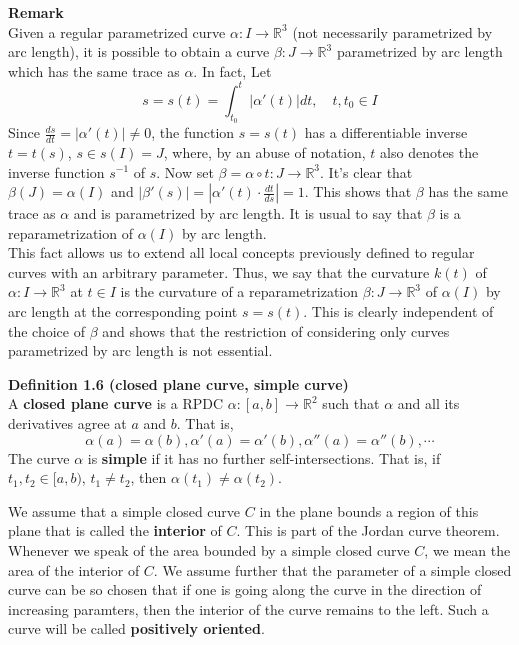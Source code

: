 \documentclass{article}
\begin{document}
\par
\textbf{Remark}\\
Given a regular parametrized curve $\alpha:I \to \mathbb R^3$ (not necessarily parametrized by arc length), it is
possible to obtain a curve $\beta:J \to \mathbb R^3$ parametrized by arc length which has the same trace as 
$\alpha$. In fact, Let
$$
    s = s(t) = \int_{t_0}^{t}|\alpha'(t)|dt,\quad t,t_0 \in I
$$
Since $\frac{ds}{dt} = |\alpha'(t)| \neq 0$, the function $s = s(t)$ has a differentiable inverse
$t = t(s)$, $s \in s(I) = J$, where, by an abuse of notation, $t$ also denotes the inverse function $s^{-1}$ of
$s$. Now set $\beta = \alpha \circ t:J \to \mathbb R^3$. It's clear that $\beta(J) = \alpha(I)$ and
$|\beta'(s)| = |\alpha'(t) \cdot \frac{dt}{ds}| = 1$. This shows that $\beta$ has the same trace as $\alpha$ and
is parametrized by arc length. It is usual to say that $\beta$ is a reparametrization of $\alpha(I)$ by arc
length.\\
This fact allows us to extend all local concepts previously defined to regular curves with an arbitrary parameter.
Thus, we say that the curvature $k(t)$ of $\alpha:I \to \mathbb R^3$ at $t \in I$ is the curvature of a
reparametrization $\beta: J \to \mathbb R^3$ of $\alpha(I)$ by arc length at the corresponding point $s = s(t)$.
This is clearly independent of the choice of $\beta$ and shows that the restriction of considering only curves
parametrized by arc length is not essential.

\par
\textbf{Definition 1.6 (closed plane curve, simple curve)}\\
A \textbf{closed plane curve} is a RPDC $\alpha:[a,b] \to \mathbb R^2$ such that $\alpha$ and all its derivatives
agree at $a$ and $b$. That is,
$$
    \alpha(a) = \alpha(b), \alpha'(a) = \alpha'(b), \alpha''(a) = \alpha''(b), \cdots
$$
The curve $\alpha$ is \textbf{simple} if it has no further self-intersections. That is, if $t_1, t_2 \in [a,b)$, 
$t_1 \neq t_2$, then $\alpha(t_1) \neq \alpha(t_2)$.

\par
We assume that a simple closed curve $C$ in the plane bounds a region of this plane that is called the 
\textbf{interior} of $C$. This is part of the Jordan curve theorem. Whenever we speak of the area bounded by a
simple closed curve $C$, we mean the area of the interior of $C$. We assume further that the parameter of a
simple closed curve can be so chosen that if one is going along the curve in the direction of increasing paramters,
then the interior of the curve remains to the left. Such a curve will be called \textbf{positively oriented}.
\end{document}
